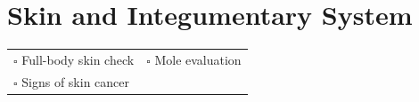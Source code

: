 
\section{Skin and Integumentary System}
\label{sec:skin}

\begin{tabular}{p{9cm} p{8cm}}
$\square$ Full-body skin check & $\square$ Mole evaluation \\ 
$\square$ Signs of skin cancer & \\ 
\end{tabular}

